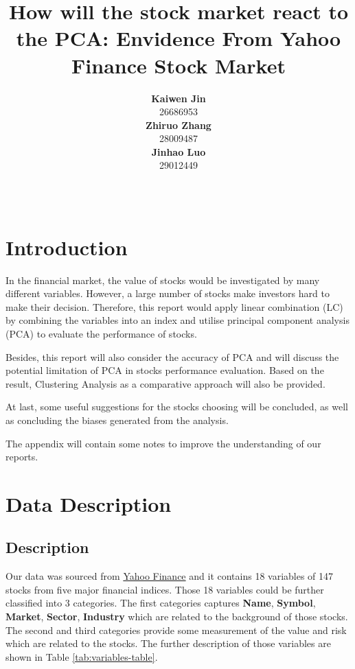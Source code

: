 \documentclass[11pt,a4paper,]{article}
\title{How will the stock market react to the PCA: Envidence From Yahoo Finance Stock Market}
\author{\sf\Large\textbf{ Kaiwen Jin}\\ {\sf\large 26686953\\[0.5cm]} \sf\Large\textbf{ Zhiruo Zhang}\\ {\sf\large 28009487\\[0.5cm]} \sf\Large\textbf{ Jinhao Luo}\\ {\sf\large 29012449\\[0.5cm]}}
\date{\sf\Date~\Month~\Year}
\makeatletter
\def\titlepage{\front{\expandafter{\@title}}{\@author}{\@organization}}
\makeatother
\begin{document}
\titlepage

{
\setcounter{tocdepth}{2}
\tableofcontents
}
\clearpage

\hypertarget{introduction}{%
\section{Introduction}\label{introduction}}

In the financial market, the value of stocks would be investigated by many different variables. However, a large number of stocks make investors hard to make their decision. Therefore, this report would apply linear combination (LC) by combining the variables into an index and utilise principal component analysis (PCA) to evaluate the performance of stocks.

Besides, this report will also consider the accuracy of PCA and will discuss the potential limitation of PCA in stocks performance evaluation. Based on the result, Clustering Analysis as a comparative approach will also be provided.

At last, some useful suggestions for the stocks choosing will be concluded, as well as concluding the biases generated from the analysis.

The appendix will contain some notes to improve the understanding of our reports.

\hypertarget{data-description}{%
\section{Data Description}\label{data-description}}

\hypertarget{description}{%
\subsection{Description}\label{description}}

Our data was sourced from \href{https://au.finance.yahoo.com/}{Yahoo Finance} and it contains 18 variables of 147 stocks from five major financial indices. Those 18 variables could be further classified into 3 categories. The first categories captures \textbf{Name}, \textbf{Symbol}, \textbf{Market}, \textbf{Sector}, \textbf{Industry} which are related to the background of those stocks. The second and third categories provide some measurement of the value and risk which are related to the stocks. The further description of those variables are shown in Table \ref{tab:variables-table}.
\end{document}
